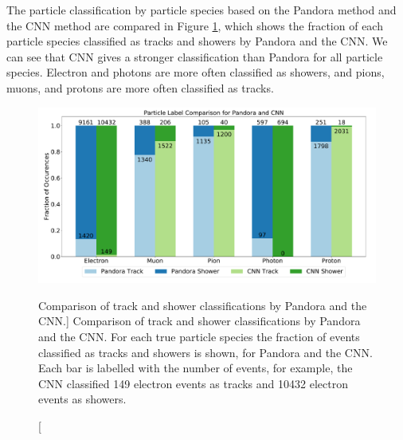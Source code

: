 The particle classification by particle species based on the Pandora method and
the CNN method are compared in Figure \ref{fig:track_show_pan_cnn}, which 
shows the fraction of each particle species classified as tracks and showers 
by Pandora and the CNN. We can see that CNN gives a stronger classification 
than Pandora for all particle species. Electron and photons are more often 
classified as showers, and pions, muons, and protons are more often classified 
as tracks. 
\begin{figure}
	\centering
	\includegraphics[width=\textwidth]{figures/track_shower_labels.pdf}
	\caption
	[Comparison of track and shower classifications by Pandora and the CNN.]
	{Comparison of track and shower classifications by Pandora and the CNN. For
	each true particle species the fraction of events classified as tracks and
	showers is shown, for Pandora and the CNN. Each bar is labelled with the 
	number of events, for example, the CNN classified 149 electron events as 
	tracks and 10432 electron events as showers.}
	\label{fig:track_show_pan_cnn}
\end{figure}

